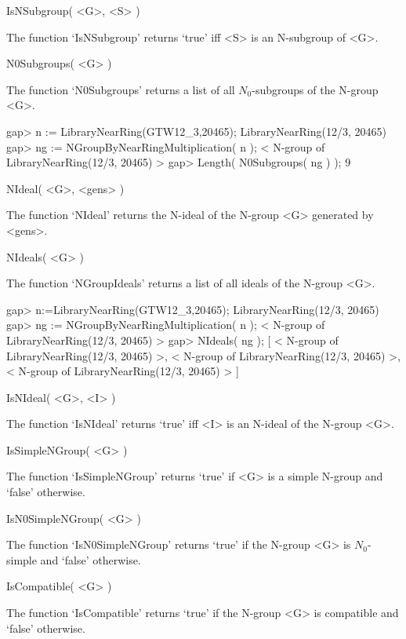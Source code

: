 \>IsNSubgroup( <G>, <S> )

The function `IsNSubgroup' returns `true' iff <S> is an N-subgroup of
<G>.



\>N0Subgroups( <G> )

The function `N0Subgroups' returns a list of all $N_0$-subgroups
of the N-group <G>.

\beginexample
    gap> n := LibraryNearRing(GTW12_3,20465);
    LibraryNearRing(12/3, 20465)
    gap> ng := NGroupByNearRingMultiplication( n );
    < N-group of LibraryNearRing(12/3, 20465) >
    gap> Length( N0Subgroups( ng ) );
    9
\endexample



\>NIdeal( <G>, <gens> )

The function `NIdeal' returns the N-ideal of the N-group <G> generated
by <gens>.

\>NIdeals( <G> )

The function `NGroupIdeals' returns a list of all ideals of the N-group <G>.

\beginexample
    gap> n:=LibraryNearRing(GTW12_3,20465);
    LibraryNearRing(12/3, 20465)
    gap> ng := NGroupByNearRingMultiplication( n );
    < N-group of LibraryNearRing(12/3, 20465) >
    gap> NIdeals( ng );
    [ < N-group of LibraryNearRing(12/3, 20465) >, 
      < N-group of LibraryNearRing(12/3, 20465) >, 
      < N-group of LibraryNearRing(12/3, 20465) > ]
\endexample

\>IsNIdeal( <G>, <I> )

The function `IsNIdeal' returns `true' iff <I> is an N-ideal of the
N-group <G>.

\>IsSimpleNGroup( <G> )

The function `IsSimpleNGroup' returns `true' if <G> is a simple N-group
and `false' otherwise.

\>IsN0SimpleNGroup( <G> )

The function `IsN0SimpleNGroup' returns `true' if the N-group <G> is
$N_0$-simple and `false' otherwise.



\>IsCompatible( <G> )

The function `IsCompatible' returns `true' if the N-group <G> is compatible
and `false' otherwise.

